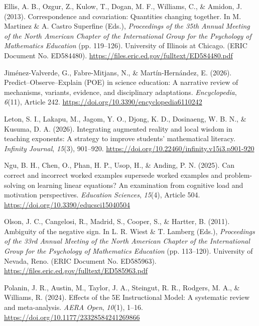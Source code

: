 \documentclass[a4paper,12pt]{article}
\begin{document}
{\TimesEn\linespread{1.0}\fontsize{10.8pt}{16.2pt}\selectfont
\begingroup
\setlength{\parindent}{0pt}
\setlength{\parskip}{3.5pt}

\hangindent=0.85cm
Ellis, A. B., Ozgur, Z., Kulow, T., Dogan, M. F., Williams, C., \& Amidon, J. (2013). Correspondence and covariation: Quantities changing together. In M. Martinez \& A. Castro Superfine (Eds.), \textit{Proceedings of the 35th Annual Meeting of the North American Chapter of the International Group for the Psychology of Mathematics Education} (pp. 119--126). University of Illinois at Chicago. (ERIC Document No. ED584480). \url{https://files.eric.ed.gov/fulltext/ED584480.pdf}

\hangindent=0.85cm
Jim\'enez-Valverde, G., Fabre-Mitjans, N., \& Mart\'in-Hern\'andez, E. (2026). Predict--Observe--Explain (POE) in science education: A narrative review of mechanisms, variants, evidence, and disciplinary adaptations. \textit{Encyclopedia}, \textit{6}(11), Article 242. \url{https://doi.org/10.3390/encyclopedia6110242}

\hangindent=0.85cm
Leton, S. I., Lakapu, M., Jagom, Y. O., Djong, K. D., Dosinaeng, W. B. N., \& Kusuma, D. A. (2026). Integrating augmented reality and local wisdom in teaching exponents: A strategy to improve students' mathematical literacy. \textit{Infinity Journal}, \textit{15}(3), 901--920. \url{https://doi.org/10.22460/infinity.v15i3.p901-920}

\hangindent=0.85cm
Ngu, B. H., Chen, O., Phan, H. P., Usop, H., \& Anding, P. N. (2025). Can correct and incorrect worked examples supersede worked examples and problem-solving on learning linear equations? An examination from cognitive load and motivation perspectives. \textit{Education Sciences}, \textit{15}(4), Article 504. \url{https://doi.org/10.3390/educsci15040504}

\hangindent=0.85cm
Olson, J. C., Cangelosi, R., Madrid, S., Cooper, S., \& Hartter, B. (2011). Ambiguity of the negative sign. In L. R. Wiest \& T. Lamberg (Eds.), \textit{Proceedings of the 33rd Annual Meeting of the North American Chapter of the International Group for the Psychology of Mathematics Education} (pp. 113--120). University of Nevada, Reno. (ERIC Document No. ED585963). \url{https://files.eric.ed.gov/fulltext/ED585963.pdf}

\hangindent=0.85cm
Polanin, J. R., Austin, M., Taylor, J. A., Steingut, R. R., Rodgers, M. A., \& Williams, R. (2024). Effects of the 5E Instructional Model: A systematic review and meta-analysis. \textit{AERA Open}, \textit{10}(1), 1--16. \url{https://doi.org/10.1177/23328584241269866}

}
\end{document}
